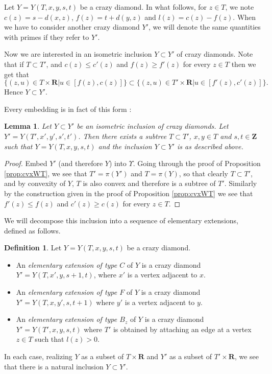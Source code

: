 \documentclass[a4paper, 11pt]{article}
\theoremstyle{plain}
\newtheorem{lemma}[proposition]{Lemma}
\theoremstyle{definition}
\newtheorem{definition}[proposition]{Definition}
\theoremstyle{remark}
\newcommand{\RR}{\mathbf{R}}                          %
\newcommand{\ZZ}{\mathbf{Z}}                          %
\begin{document}
Let $Y=Y(T,x,y,s,t)$ be a crazy diamond. In what follows, for $z\in T$, we note $c(z)=s-d(x,z)$, $f(z)=t+d(y,z)$ and $l(z)=c(z)-f(z)$. When we have to consider another crazy diamond $Y'$, we will denote the same quantities with primes if they refer to $Y'$.

Now we are interested in an isometric  inclusion $Y\subset Y'$ of crazy diamonds.   Note that if $T\subset T'$, and $c(z)\leq c'(z)$ and $f(z)\geq f'(z)$ for every $z\in T$ then we get that $$\{ (z,u)\in T\times\RR | u \in [f(z),c(z)] \}\subset\{ (z,u) \in T'\times \RR| u \in [f'(z),c'(z)] \}.$$
Hence $Y\subset Y'$. 

Every embedding is in fact of this form :



\begin{lemma}\label{lem:extstd}
Let $Y\subset Y'$ be an isometric inclusion of crazy diamonds. Let $Y'=Y(T',x',y',s',t')$. Then there exists a subtree $T\subset T'$, $x,y\in T$ and $s,t\in \ZZ$ such that $Y=Y(T,x,y,s,t)$ and the inclusion $Y\subset Y'$ is as described above.

\end{lemma}

\begin{proof}
Embed $Y'$ (and therefore $Y$) into $\Upsilon$. Going through the proof of Proposition \ref{prop:cvxWT}, we see that $T'=\pi(Y')$ and $T=\pi(Y)$, so that clearly $T\subset T'$, and by convexity of $Y$, $T$ is also convex and therefore is a subtree of $T'$. Similarly by the construction given in the proof of Proposition \ref{prop:cvxWT} we see that $f'(z)\leq f(z)$ and $c'(z)\geq c(z)$ for every $z\in T$.
\end{proof}


We will decompose this inclusion into a sequence of elementary extensions, defined as follows.

\begin{definition}
Let $Y=Y(T,x,y,s,t)$ be a crazy diamond.
\begin{itemize}
\item An \emph{elementary extension of type $C$} of $Y$ is a crazy diamond $Y'=Y(T,x',y,s+1,t)$, where $x'$ is a vertex adjacent to $x$.
\item An \emph{elementary extension of type $F$} of $Y$ is a crazy diamond $Y'=Y(T,x,y',s,t+1)$ where $y'$ is a vertex adjacent to $y$.
\item An \emph{elementary extension of type $B_z$} of $Y$ is a crazy diamond $Y'=Y(T',x,y,s,t)$ where $T'$ is obtained by attaching an edge at a vertex $z\in T$ such that $l(z)> 0$.
\end{itemize}
In each case, realizing $Y$ as a subset of $T\times \RR$ and $Y'$ as a subset of $T'\times \RR$, we see that there is a natural inclusion $Y\subset Y'$.
\end{definition}
\end{document}
